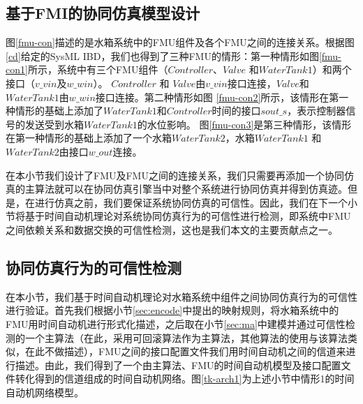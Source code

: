 \subsection{基于FMI的协同仿真模型设计} 
\label{sec:case}
图\ref{fmu-con}描述的是水箱系统中的FMU组件及各个FMU之间的连接关系。根据图\ref{cd}给定的SysML IBD，我们也得到了三种FMU的情形：第一种情形如图\ref{fmu-con1}所示，系统中有三个FMU组件（$Controller$、$Valve$ 和$WaterTank1$）和两个接口（$v \_ vin$及$w \_ win$）。 $Controller$ 和 $Valve$由$v \_ vin$接口连接，$Valve$和$WaterTank1$由$w \_ win$接口连接。第二种情形如图 \ref{fmu-con2}所示，该情形在第一种情形的基础上添加了$WaterTank1$和$Controller$时间的接口$sout \_ s$，表示控制器信号的发送受到水箱$WaterTank1$的水位影响。 图\ref{fmu-con3}是第三种情形，该情形在第一种情形的基础上添加了一个水箱$WaterTank2$，水箱$WaterTank1$ 和$WaterTank2$由接口$w \_ out$连接。 
\begin{figure}[htbp]
\end{figure}

在本小节我们设计了FMU及FMU之间的连接关系，我们只需要再添加一个协同仿真的主算法就可以在协同仿真引擎当中对整个系统进行协同仿真并得到仿真迹。但是，在进行仿真之前，我们要保证系统协同仿真的可信性。因此，我们在下一个小节将基于时间自动机理论对系统协同仿真行为的可信性进行检测，即系统中FMU之间依赖关系和数据交换的可信性检测，这也是我们本文的主要贡献点之一。
\subsection{协同仿真行为的可信性检测} 
\label{sec:mauppaal}
在本小节，我们基于时间自动机理论对水箱系统中组件之间协同仿真行为的可信性进行验证。首先我们根据小节\ref{sec:encode}中提出的映射规则，将水箱系统中的FMU用时间自动机进行形式化描述，之后取在小节\ref{sec:ma}中建模并通过可信性检测的一个主算法（在此，采用可回滚算法作为主算法，其他算法的使用与该算法类似，在此不做描述），FMU之间的接口配置文件我们用时间自动机之间的信道来进行描述。由此，我们得到了一个由主算法、FMU的时间自动机模型及接口配置文件转化得到的信道组成的时间自动机网络。图\ref{tk-arch1}为上述小节中情形1的时间自动机网络模型。

